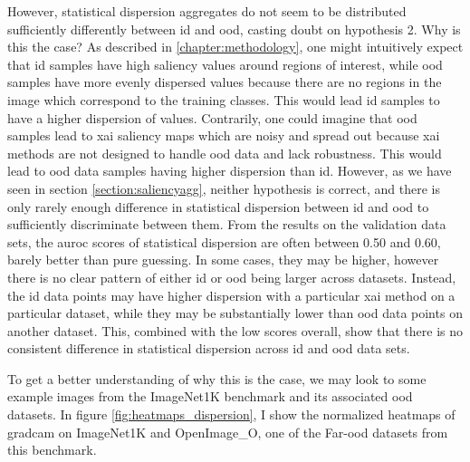 \documentclass[UKenglish]{uiomasterthesis} %
\theoremstyle{definition}
\begin{document}
However, statistical dispersion aggregates do not seem to be distributed sufficiently differently between \ac{id} and \ac{ood}, casting doubt on hypothesis 2. Why is this the case? As described in \ref{chapter:methodology}, one might intuitively expect that \ac{id} samples have high saliency values around regions of interest, while \ac{ood} samples have more evenly dispersed values because there are no regions in the image which correspond to the training classes. This would lead \ac{id} samples to have a higher dispersion of values. Contrarily, one could imagine that \ac{ood} samples lead to \ac{xai} saliency maps which are noisy and spread out because \ac{xai} methods are not designed to handle \ac{ood} data and lack robustness. This would lead to \ac{ood} data samples having higher dispersion than \ac{id}. However, as we have seen in section \ref{section:saliencyagg}, neither hypothesis is correct, and there is only rarely enough difference in statistical dispersion between \ac{id} and \ac{ood} to sufficiently discriminate between them. From the results on the validation data sets, the \ac{auroc} scores of statistical dispersion are often between 0.50 and 0.60, barely better than pure guessing. In some cases, they may be higher, however there is no clear pattern of either \ac{id} or \ac{ood} being larger across datasets. Instead, the \ac{id} data points may have higher dispersion with a particular \ac{xai} method on a particular dataset, while they may be substantially lower than \ac{ood} data points on another dataset. This, combined with the low scores overall, show that there is no consistent difference in statistical dispersion across \ac{id} and \ac{ood} data sets.

To get a better understanding of why this is the case, we may look to some example images from the ImageNet1K benchmark and its associated \ac{ood} datasets. In figure \ref{fig:heatmaps_dispersion}, I show the normalized heatmaps of \ac{gradcam} on ImageNet1K and OpenImage\_O, one of the Far-\ac{ood} datasets from this benchmark.
\end{document}
